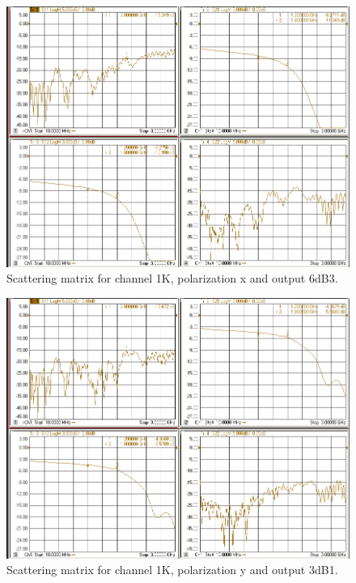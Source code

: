 \documentclass[12pt,a4paper,oneside]{article}
\begin{document}
\begin{figure}[H]
\centering
\includegraphics[width=0.9\linewidth]{VNA_results/1Kx_6dB3.png}
\caption{Scattering matrix for channel 1K, polarization x and output 6dB3.}
\label{fig:1Kx_6dB3}
\end{figure}


\begin{figure}[H]
\centering
\includegraphics[width=0.9\linewidth]{VNA_results/1Ky_3dB1.png}
\caption{Scattering matrix for channel 1K, polarization y and output 3dB1.}
\label{fig:1Ky_3dB1}
\end{figure}
\end{document}

